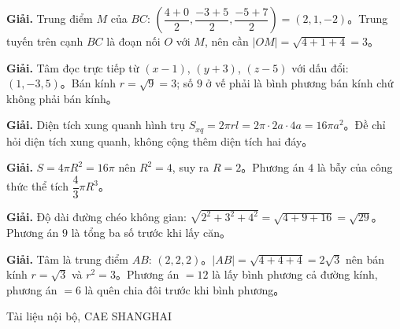 \documentclass[11pt, a4paper]{article}
\begin{document}
\vspace{0.3cm}
\begin{dapan}[43 — Đáp án A]

\textbf{Giải.} Trung điểm $M$ của $BC$: $\left(\dfrac{4+0}{2},\dfrac{-3+5}{2},\dfrac{-5+7}{2}\right)=(2,1,-2)$。Trung tuyến trên cạnh $BC$ là đoạn nối $O$ với $M$, nên cần $\lvert OM\rvert=\sqrt{4+1+4}=3$。


\end{dapan}
\vspace{0.3cm}
\begin{dapan}[44 — Đáp án C]

\textbf{Giải.} Tâm đọc trực tiếp từ $(x-1)$, $(y+3)$, $(z-5)$ với dấu đổi: $(1,-3,5)$。Bán kính $r=\sqrt{9}=3$; số $9$ ở vế phải là bình phương bán kính chứ không phải bán kính。


\end{dapan}
\vspace{0.3cm}
\begin{dapan}[45 — Đáp án B]

\textbf{Giải.} Diện tích xung quanh hình trụ $S_{xq}=2\pi rl=2\pi\cdot2a\cdot4a=16\pi a^2$。Đề chỉ hỏi diện tích xung quanh, không cộng thêm diện tích hai đáy。


\end{dapan}
\vspace{0.3cm}
\begin{dapan}[46 — Đáp án C]

\textbf{Giải.} $S=4\pi R^2=16\pi$ nên $R^2=4$, suy ra $R=2$。Phương án $4$ là bẫy của công thức thể tích $\dfrac{4}{3}\pi R^3$。


\end{dapan}
\vspace{0.3cm}
\begin{dapan}[47 — Đáp án D]

\textbf{Giải.} Độ dài đường chéo không gian: $\sqrt{2^2+3^2+4^2}=\sqrt{4+9+16}=\sqrt{29}$。Phương án $9$ là tổng ba số trước khi lấy căn。


\end{dapan}
\vspace{0.3cm}
\begin{dapan}[48 — Đáp án C]

\textbf{Giải.} Tâm là trung điểm $AB$: $(2,2,2)$。$\lvert AB\rvert=\sqrt{4+4+4}=2\sqrt{3}$ nên bán kính $r=\sqrt{3}$ và $r^2=3$。Phương án $=12$ là lấy bình phương cả đường kính, phương án $=6$ là quên chia đôi trước khi bình phương。
\end{dapan}
\vspace{0.3cm}

\vspace{0.8cm}
\begin{center}
{\footnotesize\color{cae_blue} Tài liệu nội bộ, CAE SHANGHAI}
\end{center}
\end{document}
